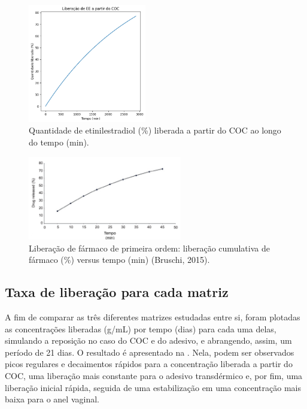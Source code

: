\begin{figure}[!htb]
    \centering
        \includegraphics[width=0.46\textwidth]{figuras/liberacao_coc.png}
        \caption[Liberação cumulativa a partir do COC]{Quantidade de etinilestradiol (\%) liberada a partir do COC ao longo do tempo (min).}
    \label{fig:liberacao_coc}
\end{figure}

\begin{figure}[!htb]
    \centering
        \includegraphics[width=0.6\textwidth]{figuras/primeira_ordem.png}
        \caption[Liberação de fármaco de primeira ordem]{Liberação de fármaco de primeira ordem: liberação cumulativa de fármaco (\%) versus tempo (min) (Bruschi, 2015).}
    \label{fig:primeira_ordem}
\end{figure}

\subsection{Taxa de liberação para cada matriz}

A fim de comparar as três diferentes matrizes estudadas entre si, foram plotadas as concentrações liberadas (\textmu g/mL) por tempo (dias) para cada uma delas, simulando a reposição no caso do COC e do adesivo, e abrangendo, assim, um período de 21 dias. O resultado é apresentado na . Nela, podem ser observados picos regulares e decaimentos rápidos para a concentração liberada a partir do COC, uma liberação mais constante para o adesivo transdérmico e, por fim, uma liberação inicial rápida, seguida de uma estabilização em uma concentração mais baixa para o anel vaginal.

